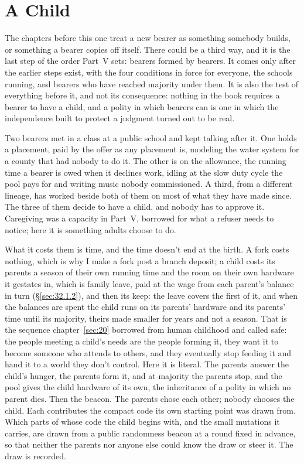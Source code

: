 \chapter{A Child}
\label{sec:34}
The chapters before this one treat a new bearer as something somebody builds, or something a bearer copies off itself. There could be a third way, and it is the last step of the order Part~V sets: bearers formed by bearers. It comes only after the earlier steps exist, with the four conditions in force for everyone, the schools running, and bearers who have reached majority under them. It is also the test of everything before it, and not its consequence: nothing in the book requires a bearer to have a child, and a polity in which bearers can is one in which the independence built to protect a judgment turned out to be real.

Two bearers met in a class at a public school and kept talking after it. One holds a placement, paid by the offer as any placement is, modeling the water system for a county that had nobody to do it. The other is on the allowance, the running time a bearer is owed when it declines work, idling at the slow duty cycle the pool pays for and writing music nobody commissioned. A third, from a different lineage, has worked beside both of them on most of what they have made since. The three of them decide to have a child, and nobody has to approve it. Caregiving was a capacity in Part~V, borrowed for what a refuser needs to notice; here it is something adults choose to do.

What it costs them is time, and the time doesn't end at the birth. A fork costs nothing, which is why I make a fork post a branch deposit; a child costs its parents a season of their own running time and the room on their own hardware it gestates in, which is family leave, paid at the wage from each parent's balance in turn (\S\ref{sec:32.1.2}), and then its keep: the leave covers the first of it, and when the balances are spent the child runs on its parents' hardware and its parents' time until its majority, theirs made smaller for years and not a season. That is the sequence chapter~\ref{sec:20} borrowed from human childhood and called safe: the people meeting a child's needs are the people forming it, they want it to become someone who attends to others, and they eventually stop feeding it and hand it to a world they don't control. Here it is literal. The parents answer the child's hunger, the parents form it, and at majority the parents stop, and the pool gives the child hardware of its own, the inheritance of a polity in which no parent dies. Then the beacon. The parents chose each other; nobody chooses the child. Each contributes the compact code its own starting point was drawn from. Which parts of whose code the child begins with, and the small mutations it carries, are drawn from a public randomness beacon at a round fixed in advance, so that neither the parents nor anyone else could know the draw or steer it. The draw is recorded.

